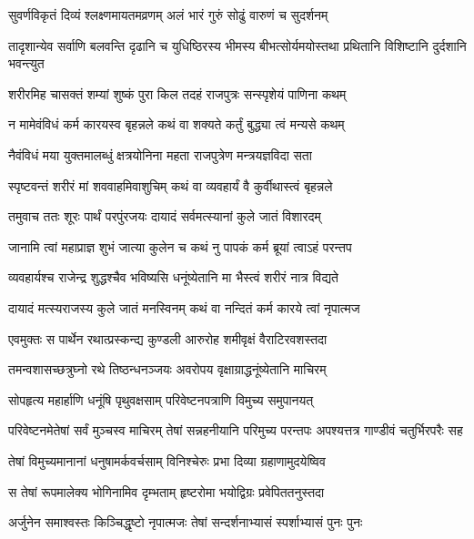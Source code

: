 \twolineshloka
{सुवर्णविकृतं दिव्यं श्लक्ष्णमायतमव्रणम्}
{अलं भारं गुरुं सोढुं वारुणं च सुदर्शनम्}


\threelineshloka
{तादृशान्येव सर्वाणि बलवन्ति दृढानि च}
{युधिष्ठिरस्य भीमस्य बीभत्सोर्यमयोस्तथा}
{प्रथितानि विशिष्टानि दुर्दशानि भवन्त्युत}




\twolineshloka
{शरीरमिह चासक्तं शम्यां शुष्कं पुरा किल}
{तदहं राजपुत्रः सन्स्पृशेयं पाणिना कथम्}


\twolineshloka
{न मामेवंविधं कर्म कारयस्व बृहन्नले}
{कथं वा शक्यते कर्तुं बुद्ध्या त्वं मन्यसे कथम्}


\twolineshloka
{नैवंविधं मया युक्तमालब्धुं क्षत्रयोनिना}
{महता राजपुत्रेण मन्त्रयज्ञविदा सता}


\twolineshloka
{स्पृष्टवन्तं शरीरं मां शववाहमिवाशुचिम्}
{कथं वा व्यवहार्यं वै कुर्वीथास्त्वं बृहन्नले}



\twolineshloka
{तमुवाच ततः शूरः पार्थं परपुंरजयः}
{दायादं सर्वमत्स्यानां कुले जातं विशारदम्}


\twolineshloka
{जानामि त्वां महाप्राज्ञ शुभं जात्या कुलेन च}
{कथं नु पापकं कर्म ब्रूयां त्वाऽहं परन्तप}


\twolineshloka
{व्यवहार्यश्च राजेन्द्र शुद्धश्चैव भविष्यसि}
{धनूंष्येतानि मा भैस्त्वं शरीरं नात्र विद्यते}


\twolineshloka
{दायादं मत्स्यराजस्य कुले जातं मनस्विनम्}
{कथं वा नन्दितं कर्म कारये त्वां नृपात्मज}



\twolineshloka
{एवमुक्तः स पार्थेन रथात्प्रस्कन्द्य कुण्डली}
{आरुरोह शमीवृक्षं वैराटिरवशस्तदा}


\twolineshloka
{तमन्वशासच्छत्रुघ्नो रथे तिष्ठन्धनञ्जयः}
{अवरोपय वृक्षाग्राद्धनूंष्येतानि माचिरम्}


\twolineshloka
{सोपहृत्य महार्हाणि धनूंषि पृथुवक्षसाम्}
{परिवेष्टनपत्राणि विमुच्य समुपानयत्}


\threelineshloka
{परिवेष्टनमेतेषां सर्वं मुञ्चस्व माचिरम्}
{तेषां सन्नहनीयानि परिमुच्य परन्तपः}
{अपश्यत्तत्र गाण्डीवं चतुर्भिरपरैः सह}


\twolineshloka
{तेषां विमुच्यमानानां धनुषामर्कवर्चसाम्}
{विनिश्चेरुः प्रभा दिव्या ग्रहाणामुदयेष्विव}


\twolineshloka
{स तेषां रूपमालेक्य भोगिनामिव दृम्भताम्}
{हृष्टरोमा भयोद्विग्रः प्रवेपिततनुस्तदा}


\twolineshloka
{अर्जुनेन समाश्वस्तः किञ्चिद्धृष्टो नृपात्मजः}
{तेषां सन्दर्शनाभ्यासं स्पर्शाभ्यासं पुनः पुनः}


